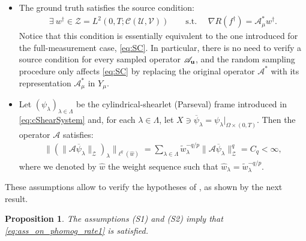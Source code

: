 \documentclass[11pt,a4paper]{article}
\numberwithin{equation}{section}
\newtheorem{proposition}[theorem]{Proposition}
\newcommand{\bu}{{\bf u}}
\newcommand{\cAbu}{\mathscr{A}_{\bu}}
\newcommand{\cA}{\mathscr{A}}
\newcommand{\cAm}{\mathscr{A}_\mu}
\begin{document}
\begin{itemize}
    \item[(S1)] The ground truth satisfies the 
    source condition: 
    \begin{align*}
    \exists \ w^\dag \in \mathcal{Z} = L^2(0,T;\mathcal{C}(\mathcal{U},\mathcal{V})) \qquad \text{s.t. } \quad  
        \nabla R(f^\dag) = \cAm^* w^\dag.
    \end{align*}
    Notice that this condition is essentially equivalent to the one introduced for the full-measurement case, \eqref{eq:SC}. In particular, there is no need to verify a source condition for every sampled operator $\cAbu$, and the random sampling procedure only affects \eqref{eq:SC} by replacing the original operator $\cA^*$ with its representation $\cAm^*$ in $Y_\mu$.
    \item[(S2)] Let $( \psi_\lambda)_{\lambda \in \Lambda}$ be the cylindrical-shearlet (Parseval) frame introduced in \eqref{eq:cShearSystem} and, for each $\lambda \in \Lambda$, let $X \ni \overline{\psi}_\lambda = \psi_\lambda|_{\Omega \times (0,T)}$. Then the operator $\cA$ satisfies:
    \begin{align*}
        \| (\| \cA \overline{\psi}_\lambda \|_\mathcal{Z} )_\lambda\|_{\ell^q(\hat{w})} = \sum_{\lambda \in \Lambda} \tilde{w}_\lambda^{-q/p} \|\cA \overline{\psi}_\lambda \|_\mathcal{Z}^q
        = C_q < \infty,
    \end{align*}
    where we denoted by $\hat{w}$ the weight sequence such that $\hat{w}_\lambda = \tilde{w}_\lambda^{-q/p}$.
\end{itemize}
These assumptions allow to verify the hypotheses of  , as shown by the next result.

\begin{proposition}
\label{prop:besov_rate}
The assumptions (S1) and (S2) imply that \eqref{eq:ass_on_phomog_rate1} is satisfied.
\end{proposition}
\end{document}
